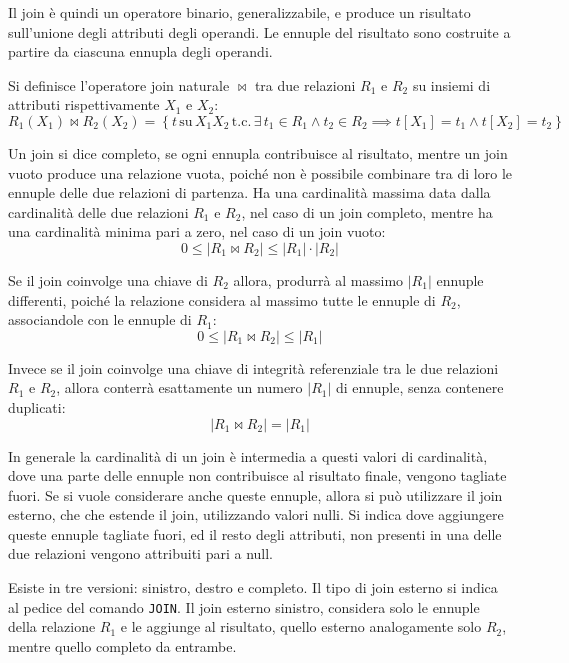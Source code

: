 \documentclass{article}
\numberwithin{equation}{subsection}
\begin{document}
Il join è quindi un operatore binario, generalizzabile, e produce un risultato sull'unione degli attributi degli operandi. Le ennuple del risultato sono costruite a partire da ciascuna ennupla degli operandi. 

Si definisce l'operatore join naturale $\Join$ tra due relazioni $R_1$ e $R_2$ su insiemi di attributi rispettivamente $X_1$ e $X_2$:
\begin{equation}
    R_1(X_1)\Join R_2(X_2)=\left\{t\,\mbox{su}\,X_1X_2\,\mbox{t.c.}\,\exists \,t_1\in R_1\land t_2\in R_2\implies t[X_1]=t_1\land t[X_2]=t_2\right\}
\end{equation} 

Un join si dice completo, se ogni ennupla contribuisce al risultato, mentre un join vuoto produce una relazione vuota, poiché non è possibile combinare tra di loro le ennuple delle due relazioni di partenza. 
Ha una cardinalità massima data dalla cardinalità delle due relazioni $R_1$ e $R_2$, nel caso di un join completo, mentre ha una cardinalità minima pari a zero, nel caso di un join vuoto:
\begin{equation}
    0\leq |R_1\Join R_2|\leq |R_1|\cdot|R_2|
\end{equation} 

Se il join coinvolge una chiave di $R_2$ allora, produrrà al massimo $|R_1|$ ennuple differenti, poiché la relazione considera al massimo tutte le ennuple di $R_2$, associandole con le ennuple di $R_1$:
\begin{equation*}
    0\leq |R_1\Join R_2|\leq |R_1|
\end{equation*}

Invece se il join coinvolge una chiave di integrità referenziale tra le due relazioni $R_1$ e $R_2$, allora conterrà esattamente un numero $|R_1|$ di ennuple, senza contenere duplicati:
\begin{equation*}
    |R_1\Join R_2|=|R_1|
\end{equation*}

In generale la cardinalità di un join è intermedia a questi valori di cardinalità, dove una parte delle ennuple non contribuisce al risultato finale, vengono tagliate fuori. 
Se si vuole considerare anche queste ennuple, allora si può utilizzare il join esterno, che che estende il join, utilizzando valori nulli. Si indica dove aggiungere queste ennuple tagliate fuori, ed il resto degli 
attributi, non presenti in una delle due relazioni vengono attribuiti pari a null. 

Esiste in tre versioni: sinistro, destro e completo. Il tipo di join esterno si indica al pedice del comando \verb|JOIN|. Il join esterno sinistro, considera solo le ennuple della relazione $R_1$ e le aggiunge al 
risultato, quello esterno analogamente solo $R_2$, mentre quello completo da entrambe. 
\end{document}

